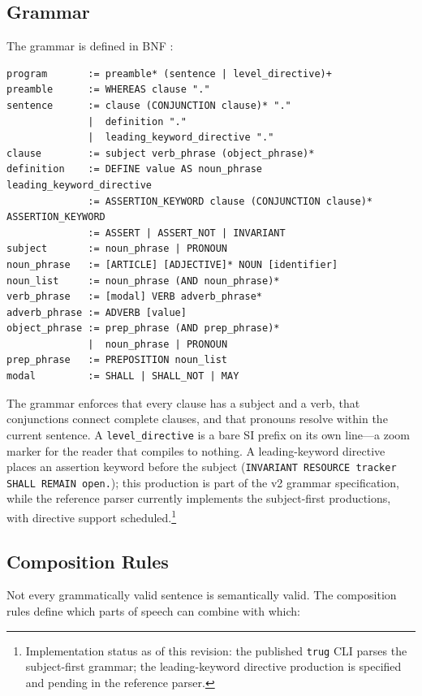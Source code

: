 \documentclass{article}
\begin{document}
\subsection{Grammar}

The grammar is defined in BNF \citep{backus1959syntax}:

\begin{lstlisting}[style=grammar]
program       := preamble* (sentence | level_directive)+
preamble      := WHEREAS clause "."
sentence      := clause (CONJUNCTION clause)* "."
              |  definition "."
              |  leading_keyword_directive "."
clause        := subject verb_phrase (object_phrase)*
definition    := DEFINE value AS noun_phrase
leading_keyword_directive
              := ASSERTION_KEYWORD clause (CONJUNCTION clause)*
ASSERTION_KEYWORD
              := ASSERT | ASSERT_NOT | INVARIANT
subject       := noun_phrase | PRONOUN
noun_phrase   := [ARTICLE] [ADJECTIVE]* NOUN [identifier]
noun_list     := noun_phrase (AND noun_phrase)*
verb_phrase   := [modal] VERB adverb_phrase*
adverb_phrase := ADVERB [value]
object_phrase := prep_phrase (AND prep_phrase)*
              |  noun_phrase | PRONOUN
prep_phrase   := PREPOSITION noun_list
modal         := SHALL | SHALL_NOT | MAY
\end{lstlisting}

The grammar enforces that every clause has a subject and a verb, that conjunctions connect complete clauses, and that pronouns resolve within the current sentence. A \texttt{level\_directive} is a bare SI prefix on its own line---a zoom marker for the reader that compiles to nothing. A leading-keyword directive places an assertion keyword before the subject (\texttt{INVARIANT RESOURCE tracker SHALL REMAIN open.}); this production is part of the v2 grammar specification, while the reference parser currently implements the subject-first productions, with directive support scheduled.\footnote{Implementation status as of this revision: the published \texttt{trug} CLI parses the subject-first grammar; the leading-keyword directive production is specified and pending in the reference parser.}

\subsection{Composition Rules}

Not every grammatically valid sentence is semantically valid. The composition rules define which parts of speech can combine with which:
\end{document}
